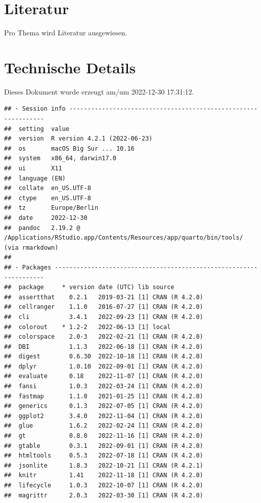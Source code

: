 \documentclass[
  a4paper,
  DIV=11]{scrreprt}
\theoremstyle{definition}
\theoremstyle{remark}
\begin{document}
\hypertarget{literatur}{%
\section*{Literatur}\label{literatur}}

Pro Thema wird Literatur ausgewiesen.

\hypertarget{technische-details}{%
\section*{Technische Details}\label{technische-details}}

Dieses Dokument wurde erzeugt am/um 2022-12-30 17:31:12.

\begin{verbatim}
## - Session info ---------------------------------------------------------------
##  setting  value
##  version  R version 4.2.1 (2022-06-23)
##  os       macOS Big Sur ... 10.16
##  system   x86_64, darwin17.0
##  ui       X11
##  language (EN)
##  collate  en_US.UTF-8
##  ctype    en_US.UTF-8
##  tz       Europe/Berlin
##  date     2022-12-30
##  pandoc   2.19.2 @ /Applications/RStudio.app/Contents/Resources/app/quarto/bin/tools/ (via rmarkdown)
## 
## - Packages -------------------------------------------------------------------
##  package     * version date (UTC) lib source
##  assertthat    0.2.1   2019-03-21 [1] CRAN (R 4.2.0)
##  cellranger    1.1.0   2016-07-27 [1] CRAN (R 4.2.0)
##  cli           3.4.1   2022-09-23 [1] CRAN (R 4.2.0)
##  colorout    * 1.2-2   2022-06-13 [1] local
##  colorspace    2.0-3   2022-02-21 [1] CRAN (R 4.2.0)
##  DBI           1.1.3   2022-06-18 [1] CRAN (R 4.2.0)
##  digest        0.6.30  2022-10-18 [1] CRAN (R 4.2.0)
##  dplyr         1.0.10  2022-09-01 [1] CRAN (R 4.2.0)
##  evaluate      0.18    2022-11-07 [1] CRAN (R 4.2.0)
##  fansi         1.0.3   2022-03-24 [1] CRAN (R 4.2.0)
##  fastmap       1.1.0   2021-01-25 [1] CRAN (R 4.2.0)
##  generics      0.1.3   2022-07-05 [1] CRAN (R 4.2.0)
##  ggplot2       3.4.0   2022-11-04 [1] CRAN (R 4.2.0)
##  glue          1.6.2   2022-02-24 [1] CRAN (R 4.2.0)
##  gt            0.8.0   2022-11-16 [1] CRAN (R 4.2.0)
##  gtable        0.3.1   2022-09-01 [1] CRAN (R 4.2.0)
##  htmltools     0.5.3   2022-07-18 [1] CRAN (R 4.2.0)
##  jsonlite      1.8.3   2022-10-21 [1] CRAN (R 4.2.1)
##  knitr         1.41    2022-11-18 [1] CRAN (R 4.2.0)
##  lifecycle     1.0.3   2022-10-07 [1] CRAN (R 4.2.0)
##  magrittr      2.0.3   2022-03-30 [1] CRAN (R 4.2.0)

\end{verbatim}
\end{document}
